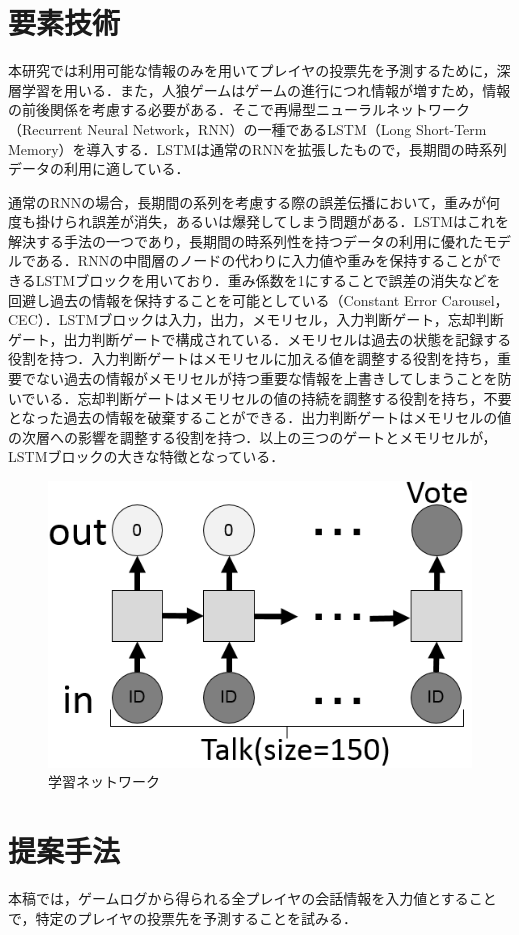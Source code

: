 \documentclass{jarticle}
\begin{document}
\section{要素技術}
本研究では利用可能な情報のみを用いてプレイヤの投票先を予測するために，深層学習を用いる．また，人狼ゲームはゲームの進行につれ情報が増すため，情報の前後関係を考慮する必要がある．そこで再帰型ニューラルネットワーク（Recurrent Neural Network，RNN）\cite{RNN}の一種であるLSTM（Long Short-Term Memory）\cite{LSTM}を導入する．LSTMは通常のRNNを拡張したもので，長期間の時系列データの利用に適している．\par
通常のRNNの場合，長期間の系列を考慮する際の誤差伝播において，重みが何度も掛けられ誤差が消失，あるいは爆発してしまう問題がある．LSTMはこれを解決する手法の一つであり，長期間の時系列性を持つデータの利用に優れたモデルである．RNNの中間層のノードの代わりに入力値や重みを保持することができるLSTMブロックを用いており．重み係数を1にすることで誤差の消失などを回避し過去の情報を保持することを可能としている（Constant Error Carousel，CEC）．LSTMブロックは入力，出力，メモリセル，入力判断ゲート，忘却判断ゲート，出力判断ゲートで構成されている．メモリセルは過去の状態を記録する役割を持つ．入力判断ゲートはメモリセルに加える値を調整する役割を持ち，重要でない過去の情報がメモリセルが持つ重要な情報を上書きしてしまうことを防いでいる．忘却判断ゲートはメモリセルの値の持続を調整する役割を持ち，不要となった過去の情報を破棄することができる．出力判断ゲートはメモリセルの値の次層への影響を調整する役割を持つ．以上の三つのゲートとメモリセルが，LSTMブロックの大きな特徴となっている．

\setlength\abovecaptionskip{0pt}
\begin{figure}[t]
  \begin{center}
  \includegraphics[width=6.0 cm]{./net.PNG}
  \end{center}
 \caption{学習ネットワーク \label{fig:net}}
 \end{figure}

\section{提案手法}
本稿では，ゲームログから得られる全プレイヤの会話情報を入力値とすることで，特定のプレイヤの投票先を予測することを試みる．\par
\end{document}
